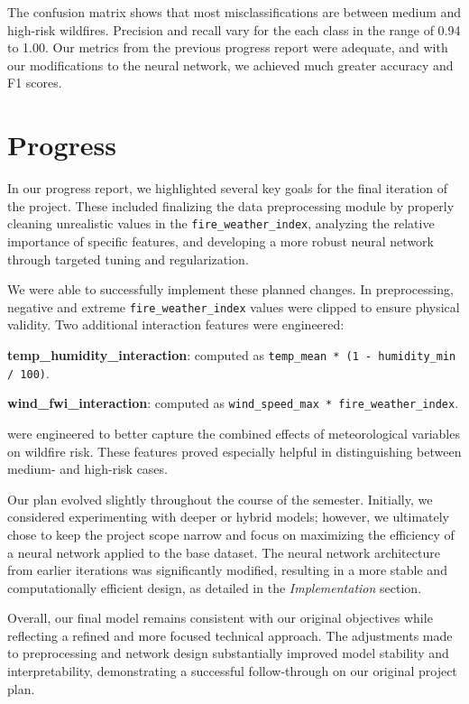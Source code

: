 \documentclass[11pt]{article}
\begin{document}
The confusion matrix shows that most misclassifications are between medium and high-risk wildfires. Precision and recall vary for the each class in the range of 0.94 to 1.00. 
Our metrics from the previous progress report were adequate, and with our modifications to the neural network, we achieved much greater accuracy and F1 scores.

\section{Progress}

In our progress report, we highlighted several key goals for the final iteration of the project. These included finalizing the data preprocessing module by properly cleaning unrealistic values in the \texttt{fire\_weather\_index}, analyzing the relative importance of specific features, and developing a more robust neural network through targeted tuning and regularization.

We were able to successfully implement these planned changes. In preprocessing, negative and extreme \texttt{fire\_weather\_index} values were clipped to ensure physical validity. Two additional interaction features were engineered:

\textbf{temp\_humidity\_interaction}: computed as \texttt{temp\_mean * (1 - humidity\_min / 100)}.

\textbf{wind\_fwi\_interaction}: computed as \texttt{wind\_speed\_max * fire\_weather\_index}.

were engineered to better capture the combined effects of meteorological variables on wildfire risk. These features proved especially helpful in distinguishing between medium- and high-risk cases.

Our plan evolved slightly throughout the course of the semester. Initially, we considered experimenting with deeper or hybrid models; however, we ultimately chose to keep the project scope narrow and focus on maximizing the efficiency of a neural network applied to the base dataset. The neural network architecture from earlier iterations was significantly modified, resulting in a more stable and computationally efficient design, as detailed in the \textit{Implementation} section.

Overall, our final model remains consistent with our original objectives while reflecting a refined and more focused technical approach. The adjustments made to preprocessing and network design substantially improved model stability and interpretability, demonstrating a successful follow-through on our original project plan.
\end{document}
